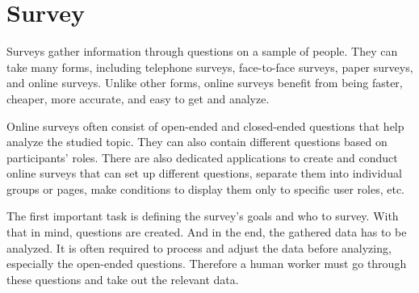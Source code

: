 \chapter{Survey}
\label{survey}

Surveys gather information through questions on a sample of people.
They can take many forms, including telephone surveys, face-to-face surveys, paper surveys, and online surveys.
Unlike other forms, online surveys benefit from being faster, cheaper, more accurate, and easy to get and analyze.

Online surveys often consist of open-ended and closed-ended questions that help analyze the studied topic.
They can also contain different questions based on participants' roles.
There are also dedicated applications to create and conduct online surveys that can set up different questions, separate them into individual groups or pages, make conditions to display them only to specific user roles, etc.

The first important task is defining the survey's goals and who to survey.
With that in mind, questions are created.
And in the end, the gathered data has to be analyzed.
It is often required to process and adjust the data before analyzing, especially the open-ended questions.
Therefore a human worker must go through these questions and take out the relevant data.



